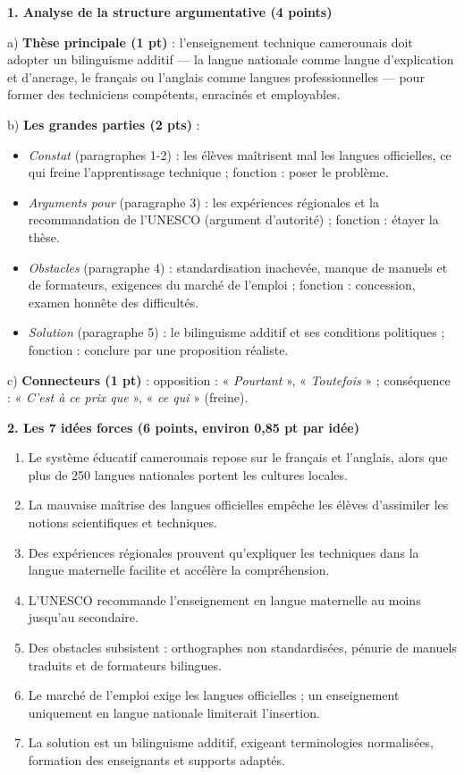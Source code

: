 \documentclass[11pt]{article}
\begin{document}
\begin{corrige}
\textbf{1. Analyse de la structure argumentative (4 points)}

a) \textbf{Thèse principale (1 pt)} : l'enseignement technique camerounais doit adopter un bilinguisme additif — la langue nationale comme langue d'explication et d'ancrage, le français ou l'anglais comme langues professionnelles — pour former des techniciens compétents, enracinés et employables.

b) \textbf{Les grandes parties (2 pts)} :
\begin{itemize}
    \item \emph{Constat} (paragraphes 1-2) : les élèves maîtrisent mal les langues officielles, ce qui freine l'apprentissage technique ; fonction : poser le problème.
    \item \emph{Arguments pour} (paragraphe 3) : les expériences régionales et la recommandation de l'UNESCO (argument d'autorité) ; fonction : étayer la thèse.
    \item \emph{Obstacles} (paragraphe 4) : standardisation inachevée, manque de manuels et de formateurs, exigences du marché de l'emploi ; fonction : concession, examen honnête des difficultés.
    \item \emph{Solution} (paragraphe 5) : le bilinguisme additif et ses conditions politiques ; fonction : conclure par une proposition réaliste.
\end{itemize}

c) \textbf{Connecteurs (1 pt)} : opposition : « \emph{Pourtant} », « \emph{Toutefois} » ; conséquence : « \emph{C'est à ce prix que} », « \emph{ce qui} » (freine).

\textbf{2. Les 7 idées forces (6 points, environ 0,85 pt par idée)}
\begin{enumerate}
    \item Le système éducatif camerounais repose sur le français et l'anglais, alors que plus de 250 langues nationales portent les cultures locales.
    \item La mauvaise maîtrise des langues officielles empêche les élèves d'assimiler les notions scientifiques et techniques.
    \item Des expériences régionales prouvent qu'expliquer les techniques dans la langue maternelle facilite et accélère la compréhension.
    \item L'UNESCO recommande l'enseignement en langue maternelle au moins jusqu'au secondaire.
    \item Des obstacles subsistent : orthographes non standardisées, pénurie de manuels traduits et de formateurs bilingues.
    \item Le marché de l'emploi exige les langues officielles ; un enseignement uniquement en langue nationale limiterait l'insertion.
    \item La solution est un bilinguisme additif, exigeant terminologies normalisées, formation des enseignants et supports adaptés.
\end{enumerate}


\end{corrige}
\end{document}
